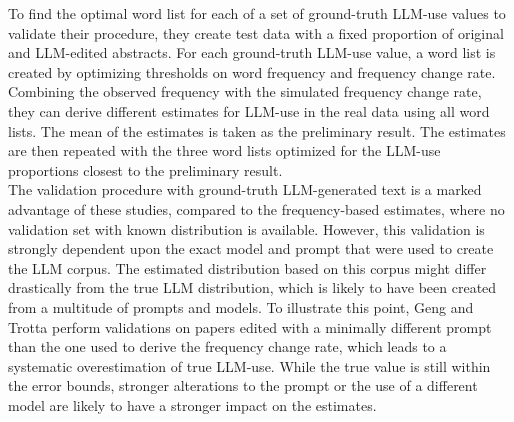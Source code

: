 To find the optimal word list for each of a set of ground-truth LLM-use values to validate their procedure, they create test data with a fixed proportion of original and LLM-edited abstracts.
For each ground-truth LLM-use value, a word list is created by optimizing thresholds on word frequency and frequency change rate.
Combining the observed frequency with the simulated frequency change rate, they can derive different estimates for LLM-use in the real data using all word lists.
The mean of the estimates is taken as the preliminary result.
The estimates are then repeated with the three word lists optimized for the LLM-use proportions closest to the preliminary result.
\\
The validation procedure with ground-truth LLM-generated text is a marked advantage of these studies, compared to the frequency-based estimates, where no validation set with known distribution is available. 
However, this validation is strongly dependent upon the exact model and prompt that were used to create the LLM corpus.
The estimated distribution based on this corpus might differ drastically from the true LLM distribution, which is likely to have been created from a multitude of prompts and models.
To illustrate this point, Geng and Trotta perform validations on papers edited with a minimally different prompt than the one used to derive the frequency change rate, which leads to a systematic overestimation of true LLM-use.
While the true value is still within the error bounds, stronger alterations to the prompt or the use of a different model are likely to have a stronger impact on the estimates.

